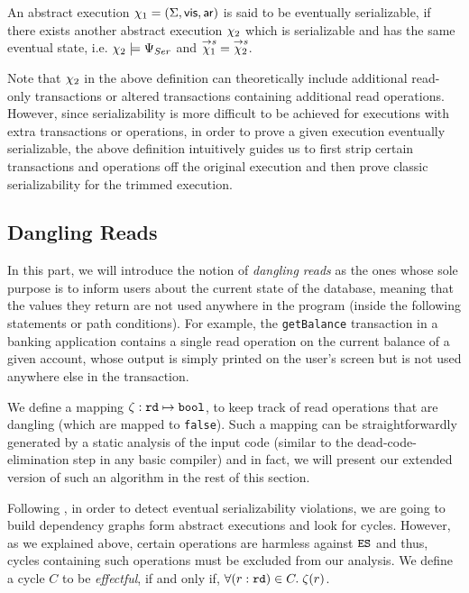 \begin{definition} 
  An abstract execution $ \chi_1 = (\Sigma, \mathsf{vis},\mathsf{ar})$
  is said to be eventually serializable, if there exists another
  abstract execution $\chi_2$ which is serializable and has the same eventual state, i.e. 
  $\chi_2 \models \Psi_{Ser} $ and $\overset{\rightarrow s}{\chi_1}=
  \overset{\rightarrow s}{\chi_2}$.
\end{definition}
Note that $\chi_2$ in the above definition can theoretically include 
additional read-only transactions or altered transactions containing
additional read operations. However, since serializability is more
difficult to be achieved for executions with extra transactions or
operations, in order to prove a given execution eventually
serializable, the above definition intuitively guides us to first strip  certain
transactions and operations off the original execution and then prove
classic serializability for the trimmed execution.

\subsection {Dangling Reads}
In this part, we will introduce the notion of \emph{dangling reads}
as the ones whose sole purpose is to inform users about the current
state of the database, meaning that the values they return are not used anywhere in
the program (inside the following statements or path conditions). For example,
the \texttt{getBalance} transaction in a banking application contains a
single read operation on
the current balance of a given account, whose output is simply printed on the
user's screen but is not used anywhere else in the transaction.

We define a mapping $\mathtt{\zeta}: \texttt{rd} \mapsto \texttt{bool}$, to keep
track of read operations that are dangling (which are mapped to
\texttt{false}). Such a mapping can be straightforwardly generated by a
static analysis of the input code
(similar to the dead-code-elimination step in any basic compiler) 
and in fact, we will present our
extended version of such an algorithm in the rest of this section.

Following \cite{Nagar:ser}, in order to detect eventual
serializability violations, we are going to build dependency graphs
form abstract executions and look for cycles. However, as we explained
above, certain operations are harmless against $\texttt{ES}$ and thus, cycles
containing such operations must be excluded from our analysis. 
We define a cycle $C$ to be \emph{effectful}, if and only if,
$\forall (r:\texttt{rd}) \in C.\; \zeta(r)$.

